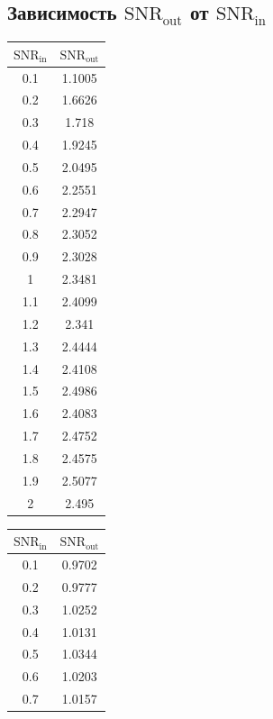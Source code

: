 \documentclass[12pt, a4paper] {ncc}
\begin{document}
    \subsection{Зависимость $\text{SNR}_{\text{out}}$ от $\text{SNR}_{\text{in}}$}
        \begin{table}[H]
            \begin{tabular} { |c|c| }
                \hline
					$\text{SNR}_\text{in}$ & $\text{SNR}_\text{out}$ \\ \hline
					0.1 &  1.1005 \\ \hline
					0.2 &  1.6626 \\ \hline
					0.3 &  1.718 \\ \hline
					0.4 &  1.9245 \\ \hline
					0.5 &  2.0495 \\ \hline
					0.6 &  2.2551 \\ \hline
					0.7 &  2.2947 \\ \hline
					0.8 &  2.3052 \\ \hline
					0.9 &  2.3028 \\ \hline
					1   &  2.3481 \\ \hline
					1.1 &  2.4099 \\ \hline
					1.2 &  2.341 \\ \hline
					1.3 &  2.4444 \\ \hline
					1.4 &  2.4108 \\ \hline
					1.5 &  2.4986 \\ \hline
					1.6 &  2.4083 \\ \hline
					1.7 &  2.4752 \\ \hline
					1.8 &  2.4575 \\ \hline
					1.9 &  2.5077 \\ \hline
					2   &  2.495 \\ \hline
			\end{tabular}
            \begin{tabular} { |c|c| }
                \hline
					$\text{SNR}_\text{in}$ & $\text{SNR}_\text{out}$ \\ \hline
						0.1 &  0.9702 \\ \hline
						0.2 &  0.9777 \\ \hline
						0.3 &  1.0252 \\ \hline
						0.4 &  1.0131 \\ \hline
						0.5 &  1.0344 \\ \hline
						0.6 &  1.0203 \\ \hline
						0.7 &  1.0157 \\ \hline

\end{tabular}
\end{table}
\end{document}
